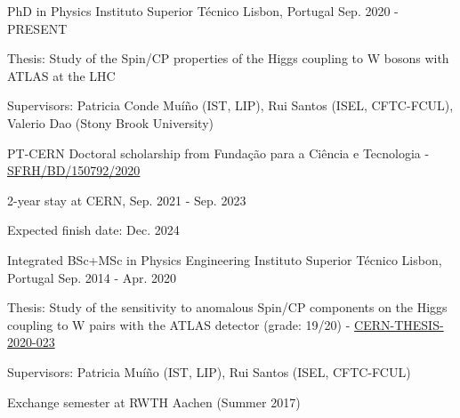 
\begin{cventries}

\cventry
  {PhD in Physics}
  {Instituto Superior Técnico}
  {Lisbon, Portugal}
  {Sep. 2020 - PRESENT}
  {
    \begin{cvitems}
      \item {Thesis: Study of the Spin/CP properties of the Higgs coupling to W bosons with ATLAS at the LHC}
      \item {Supervisors: Patricia Conde Muíño (IST, LIP), Rui Santos (ISEL, CFTC-FCUL), Valerio Dao (Stony Brook University)}
      \item {PT-CERN Doctoral scholarship from Fundação para a Ciência e Tecnologia - \href{https://doi.org/10.54499/SFRH/BD/150792/2020}{SFRH/BD/150792/2020}}
      \item {2-year stay at CERN, Sep. 2021 - Sep. 2023}
      \item {Expected finish date: Dec. 2024}
    \end{cvitems}
  }

  \cventry
    {Integrated BSc+MSc in Physics Engineering} %
    {Instituto Superior Técnico} %
    {Lisbon, Portugal} %
    {Sep. 2014 - Apr. 2020} %
    {
      \begin{cvitems} %
        \item {Thesis: Study of the sensitivity to anomalous Spin/CP components on the Higgs coupling to W pairs with the ATLAS detector (grade: 19/20) - \href{https://cds.cern.ch/record/2715646}{CERN-THESIS-2020-023}}
        \item {Supervisors: Patricia Muíño (IST, LIP), Rui Santos (ISEL, CFTC-FCUL)}
        \item {Exchange semester at RWTH Aachen (Summer 2017)}
      \end{cvitems}
    }



\end{cventries}